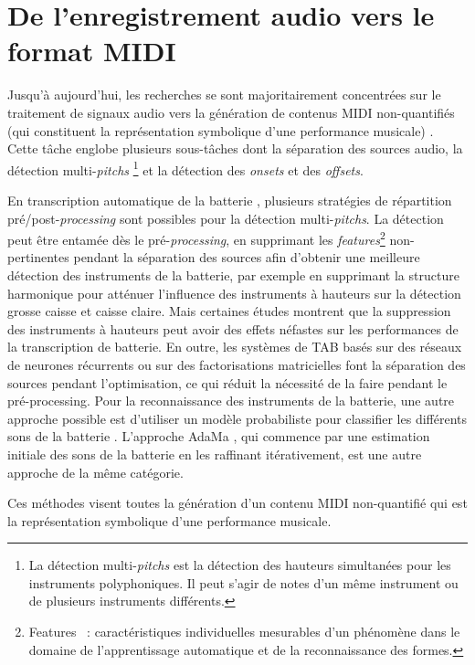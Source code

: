 \section{De l’enregistrement audio vers le format MIDI}
\label{audio_to_midi}
Jusqu’à aujourd’hui, les recherches se sont majoritairement concentrées sur le
traitement de signaux audio vers la génération de contenus MIDI non-quantifiés
(qui constituent la représentation symbolique d’une performance musicale)
\cite{AMT_for_2_Instru}. Cette tâche englobe plusieurs sous-tâches dont
la séparation des sources audio, la détection multi-\textit{pitchs} \footnote{
    La détection multi-\textit{pitchs} est la
détection des hauteurs simultanées pour les instruments polyphoniques. Il peut
s’agir de notes d’un même instrument ou de plusieurs instruments différents.}
et la détection des \textit{onsets} et des \textit{offsets}.


En transcription automatique de la batterie \cite{Review_ADT}, plusieurs
stratégies de répartition pré/post-\textit{processing} sont possibles pour la
détection multi-\textit{pitchs}. La détection peut être entamée dès le
pré-\textit{processing}, en supprimant les \textit{features}\footnote{
Features~ : caractéristiques individuelles mesurables d’un phénomène dans le
domaine de l’apprentissage automatique et de la reconnaissance des formes.}
non-pertinentes pendant la séparation des sources afin d’obtenir une meilleure
détection des instruments de la batterie, par exemple en supprimant la
structure harmonique pour atténuer l’influence des instruments à hauteurs sur
la détection grosse caisse et caisse claire. Mais certaines études montrent que
la suppression des instruments à hauteurs peut avoir des effets néfastes sur
les performances de la transcription de batterie. En outre, les systèmes de TAB
basés sur des réseaux de neurones récurrents ou sur des factorisations
matricielles font la séparation des sources pendant l’optimisation, ce qui
réduit la nécessité de la faire pendant le pré-processing. Pour la
reconnaissance des instruments de la batterie, une autre approche possible est
d’utiliser un modèle probabiliste pour classifier les différents sons de la
batterie \cite{Eronen}. L’approche AdaMa \cite{adama_1}, qui commence par une
estimation initiale des sons de la batterie en les raffinant itérativement, est
une autre approche de la même catégorie.

Ces méthodes visent toutes la génération d’un contenu MIDI non-quantifié qui
est la représentation symbolique d’une performance musicale.

